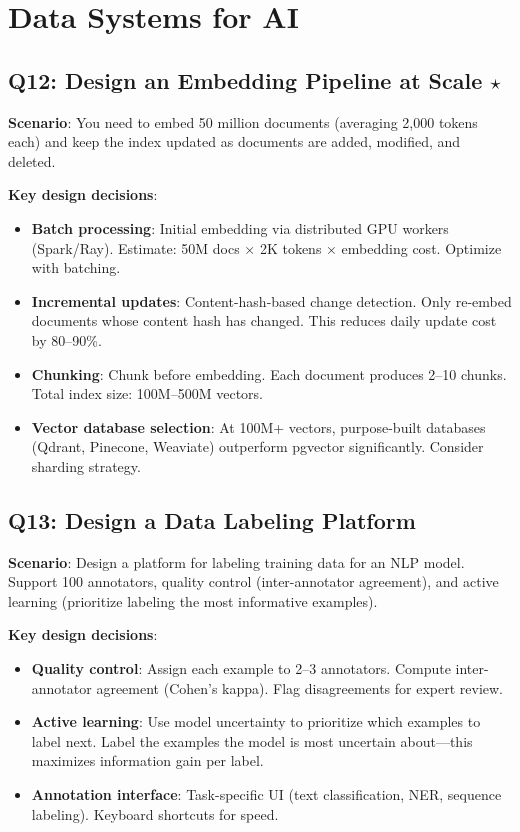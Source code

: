 \section{Data Systems for AI}

\subsection{Q12: Design an Embedding Pipeline at Scale $\star$}

\textbf{Scenario}: You need to embed 50 million documents (averaging 2,000 tokens each) and keep the index updated as documents are added, modified, and deleted.

\textbf{Key design decisions}:
\begin{itemize}[leftmargin=*]
    \item \textbf{Batch processing}: Initial embedding via distributed GPU workers (Spark/Ray). Estimate: 50M docs × 2K tokens × embedding cost. Optimize with batching.
    \item \textbf{Incremental updates}: Content-hash-based change detection. Only re-embed documents whose content hash has changed. This reduces daily update cost by 80--90\%.
    \item \textbf{Chunking}: Chunk before embedding. Each document produces 2--10 chunks. Total index size: 100M--500M vectors.
    \item \textbf{Vector database selection}: At 100M+ vectors, purpose-built databases (Qdrant, Pinecone, Weaviate) outperform pgvector significantly. Consider sharding strategy.
\end{itemize}

\subsection{Q13: Design a Data Labeling Platform}

\textbf{Scenario}: Design a platform for labeling training data for an NLP model. Support 100 annotators, quality control (inter-annotator agreement), and active learning (prioritize labeling the most informative examples).

\textbf{Key design decisions}:
\begin{itemize}[leftmargin=*]
    \item \textbf{Quality control}: Assign each example to 2--3 annotators. Compute inter-annotator agreement (Cohen's kappa). Flag disagreements for expert review.
    \item \textbf{Active learning}: Use model uncertainty to prioritize which examples to label next. Label the examples the model is most uncertain about---this maximizes information gain per label.
    \item \textbf{Annotation interface}: Task-specific UI (text classification, NER, sequence labeling). Keyboard shortcuts for speed.
\end{itemize}


